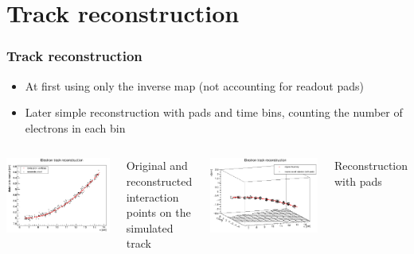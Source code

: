 \documentclass{beamer}
\begin{document}
	\section{Track reconstruction}
	\begin{frame}
		\frametitle{Track reconstruction}
		\begin{itemize}
			\item At first using only the inverse map (not accounting for readout pads)
			\item Later simple reconstruction with pads and time bins, counting the number of electrons in each bin
		\end{itemize}
		\begin{columns}
				\centering
				\begin{minipage}[t][4.5cm]{\textwidth}
					\centering
					\includegraphics[width=\textwidth]{../images/reco_track_new.png}\\
				\end{minipage}
				\small{Original and reconstructed interaction points on the simulated track}
				\centering
				\begin{minipage}[t][4.5cm]{\textwidth}
					\centering
					\includegraphics[width=\textwidth]{../images/reco_track_pads.png}\\
				\end{minipage}
				\small{Reconstruction with pads}
		\end{columns}
	\end{frame}
\end{document}
